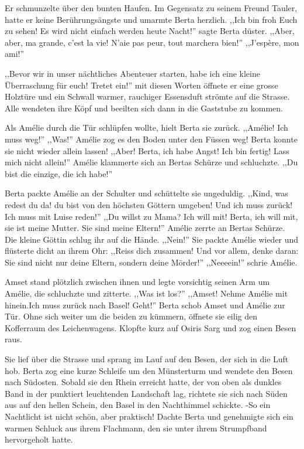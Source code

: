 \documentclass[11pt,titlepage,a5paper]{book}
\begin{document}
Er schmunzelte über den bunten Haufen. Im Gegensatz zu seinem Freund Tauler, hatte er keine Berührungsängste und umarmte Berta herzlich. ,,Ich bin froh Euch zu sehen! Es wird nicht einfach werden heute Nacht!'' sagte Berta düster. ,,Aber, aber, ma grande, c'est la vie! N'aie pas peur, tout marchera bien!'' ,,J'espère, mon ami!''

,,Bevor wir in unser nächtliches Abenteuer starten, habe ich eine kleine Überraschung für euch! Tretet ein!'' mit diesen Worten öffnete er eine grosse Holztüre und ein Schwall warmer, rauchiger Essensduft strömte auf die Strasse. Alle wendeten ihre Köpf und beeilten sich dann in die Gaststube zu kommen.

Als Amélie durch die Tür schlüpfen wollte, hielt Berta sie zurück. ,,Amélie! Ich muss weg!'' ,,Was!'' Amélie zog es den Boden unter den Füssen weg! Berta konnte sie nicht wieder allein lassen! ,,Aber! Berta, ich habe Angst! Ich bin fertig! Lass mich nicht allein!'' Amélie klammerte sich an Bertas Schürze und schluchzte. ,,Du bist die einzige, die ich habe!''

Berta packte Amélie an der Schulter und schüttelte sie ungeduldig. ,,Kind, was redest du da! du bist von den höchsten Göttern umgeben! Und ich muss zurück! Ich muss mit Luise reden!'' ,,Du willst zu Mama? Ich will mit! Berta, ich will mit, sie ist meine Mutter. Sie sind meine Eltern!'' Amélie zerrte an Bertas Schürze. Die kleine Göttin schlug ihr auf die Hände. ,,Nein!'' Sie packte Amélie wieder und flüsterte dicht an ihrem Ohr: ,,Reiss dich zusammen! Und vor allem, denke daran: Sie sind nicht nur deine Eltern, sondern deine Mörder!'' ,,Neeeein!'' schrie Amélie. 

Amset stand plötzlich zwischen ihnen und legte vorsichtig seinen Arm um Amélie, die schluchzte und zitterte. ,,Was ist los?'' ,,Amset! Nehme Amélie mit hinein.Ich muss zurück nach Basel! Geht!'' Berta schob Amset und Amélie zur Tür. Ohne sich weiter um die beiden zu kümmern, öffnete sie eilig den Kofferraum des Leichenwagens. Klopfte kurz auf Osiris Sarg und zog einen Besen raus.

Sie lief über die Strasse und sprang im Lauf auf den Besen, der sich in die Luft hob. Berta zog eine kurze Schleife um den Münsterturm und wendete den Besen nach Südosten. Sobald sie den Rhein erreicht hatte, der von oben als dunkles Band in der punktiert leuchtenden Landschaft lag, richtete sie sich nach Süden aus auf den hellen Schein, den Basel in den Nachthimmel schickte. -So ein Nachtlicht ist nicht schön, aber praktisch! Dachte Berta und genehmigte sich ein warmen Schluck aus ihrem Flachmann, den sie unter ihrem Strumpfband hervorgeholt hatte.
\end{document}

